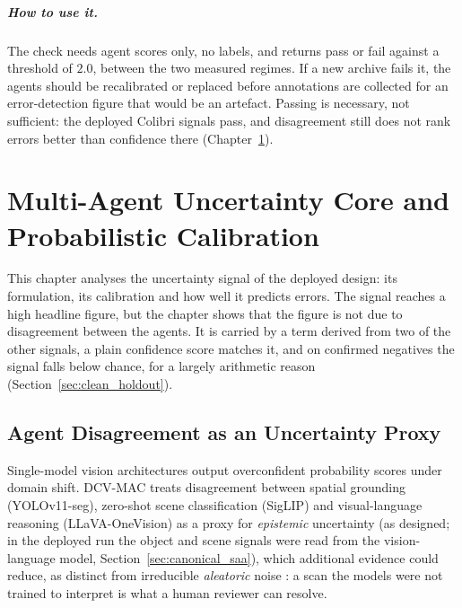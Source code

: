 \documentclass[12pt,a4paper]{report}
\begin{document}
\paragraph{How to use it.} The check needs agent scores only, no labels, and returns pass or fail against a threshold of $2.0$, between the two measured regimes. If a new archive fails it, the agents should be recalibrated or replaced before annotations are collected for an error-detection figure that would be an artefact. Passing is necessary, not sufficient: the deployed Colibri signals pass, and disagreement still does not rank errors better than confidence there (Chapter~\ref{ch:uncertainty_calibration}).

\chapter{Multi-Agent Uncertainty Core and Probabilistic Calibration}
\label{ch:uncertainty_calibration}

This chapter analyses the uncertainty signal of the deployed design: its formulation, its calibration and how well it predicts errors. The signal reaches a high headline figure, but the chapter shows that the figure is not due to disagreement between the agents. It is carried by a term derived from two of the other signals, a plain confidence score matches it, and on confirmed negatives the signal falls below chance, for a largely arithmetic reason (Section~\ref{sec:clean_holdout}).

\section{Agent Disagreement as an Uncertainty Proxy}
Single-model vision architectures output overconfident probability scores under domain shift. DCV-MAC treats disagreement between spatial grounding (YOLOv11-seg), zero-shot scene classification (SigLIP) and visual-language reasoning (LLaVA-OneVision) as a proxy for \emph{epistemic} uncertainty (as designed; in the deployed run the object and scene signals were read from the vision-language model, Section~\ref{sec:canonical_saa}), which additional evidence could reduce, as distinct from irreducible \emph{aleatoric} noise \cite{kendall2017uncertainties}: a scan the models were not trained to interpret is what a human reviewer can resolve.
\end{document}
